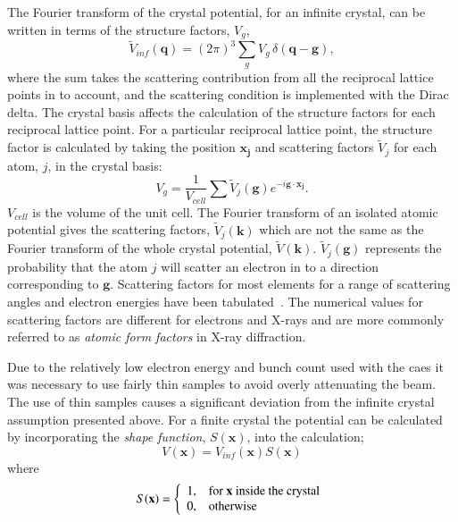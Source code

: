 The Fourier transform of the crystal potential, for an infinite crystal, can be written in terms of the structure factors, $V_g$,
\begin{equation}
\tilde{V}_{inf}(\mathbf{q}) = (2\pi)^3 \sum_g V_g \, \delta(\mathbf{q} - \mathbf{g}),
\end{equation}
where the sum takes the scattering contribution from all the reciprocal lattice points in to account, and the scattering condition is implemented with the Dirac delta.
The crystal basis affects the calculation of the structure factors for each reciprocal lattice point.
For a particular reciprocal lattice point, the structure factor is calculated by taking the position $\mathbf{x_j}$ and scattering factors $\tilde{V}_j$ for each atom, $j$, in the crystal basis:
\begin{equation}
V_g = \frac{1}{V_{cell}}\sum\tilde{V}_j(\mathbf{g})e^{-i\mathbf{g}\cdot\mathbf{x_j}}.
\end{equation}
$V_{cell}$ is the volume of the unit cell. The Fourier transform of an isolated atomic potential gives the scattering factors, $\tilde{V}_j(\mathbf{k})$ which are not the same as the Fourier transform of the whole crystal potential, $\tilde{V}(\mathbf{k})$.
$\tilde{V}_j(\mathbf{g})$ represents the probability that the atom $j$ will scatter an electron in to a direction corresponding to $\mathbf{g}$.
Scattering factors for most elements for a range of scattering angles and electron energies have been tabulated~\cite{peng_electron_1999}.
The numerical values for scattering factors are different for electrons and X-rays and are more commonly referred to as \emph{atomic form factors} in X-ray diffraction.

Due to the relatively low electron energy and bunch count used with the \gls{caes} it was necessary to use fairly thin samples to avoid overly attenuating the beam.
The use of thin samples causes a significant deviation from the infinite crystal assumption presented above.
For a finite crystal the potential can be calculated by incorporating the \emph{shape function}, $S(\mathbf{x})$, into the calculation;
\begin{equation}
V(\mathbf{x}) = V_{inf}(\mathbf{x})S(\mathbf{x})
\end{equation}
where
\begin{equation}
S(\mathbf{x}) = \left\{\begin{array}{l l}
1, & \text{for $\mathbf{x}$ inside the crystal} \\
0, & \text{otherwise}
\end{array}
\right.
\end{equation}

